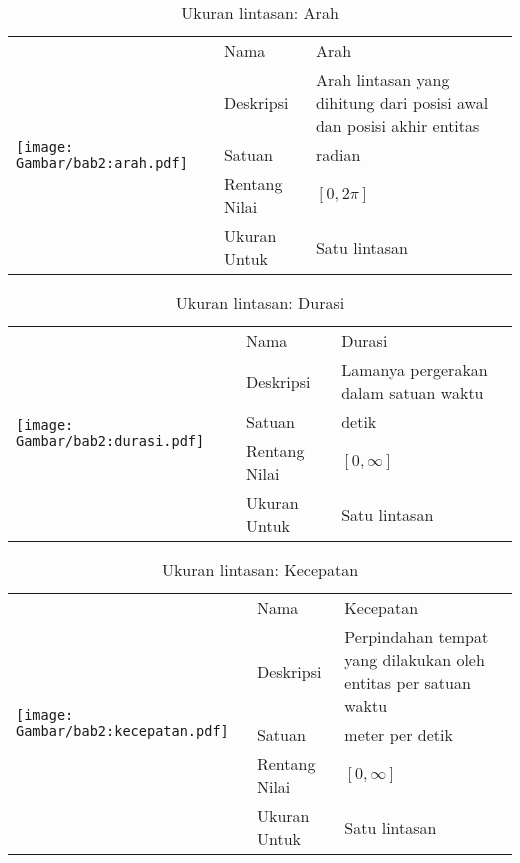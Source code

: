 \begin{table}[h!]
    \centering
    \caption{Ukuran lintasan: Arah}
    \begin{tabular}{|m{4cm}|l|p{8.5cm}|} 
        \hline
        \multirow{5}{*}{
            \texttt{[image: Gambar/bab2:arah.pdf]}
        } & Nama & Arah \\ 
        \cline{2-3}
        & Deskripsi & Arah lintasan yang dihitung dari posisi awal dan posisi akhir entitas                    \\ 
        \cline{2-3}
        & Satuan & radian                    \\ 
        \cline{2-3}
        & Rentang Nilai & $[0, 2\pi]$                    \\ 
        \cline{2-3}
        & Ukuran Untuk & Satu lintasan                    \\
        \hline
    \end{tabular}
\end{table}

\begin{table}[h!]
    \centering
    \caption{Ukuran lintasan: Durasi}
    \begin{tabular}{|m{4cm}|l|p{8.5cm}|} 
        \hline
        \multirow{5}{*}{
            \texttt{[image: Gambar/bab2:durasi.pdf]}
        } & Nama & Durasi \\ 
        \cline{2-3}
        & Deskripsi & Lamanya pergerakan dalam satuan waktu                    \\ 
        \cline{2-3}
        & Satuan & detik                    \\ 
        \cline{2-3}
        & Rentang Nilai & $[0, \infty]$                    \\ 
        \cline{2-3}
        & Ukuran Untuk & Satu lintasan                    \\
        \hline
    \end{tabular}
\end{table}

\begin{table}[h!]
    \centering
    \caption{Ukuran lintasan: Kecepatan}
    \begin{tabular}{|m{4cm}|l|p{8.5cm}|} 
        \hline
        \multirow{5}{*}{
            \texttt{[image: Gambar/bab2:kecepatan.pdf]}
        } & Nama & Kecepatan \\ 
        \cline{2-3}
        & Deskripsi & Perpindahan tempat yang dilakukan oleh entitas per satuan waktu                    \\ 
        \cline{2-3}
        & Satuan & meter per detik                   \\ 
        \cline{2-3}
        & Rentang Nilai & $[0, \infty]$                    \\ 
        \cline{2-3}
        & Ukuran Untuk & Satu lintasan                    \\
        \hline
    \end{tabular}
\end{table}

